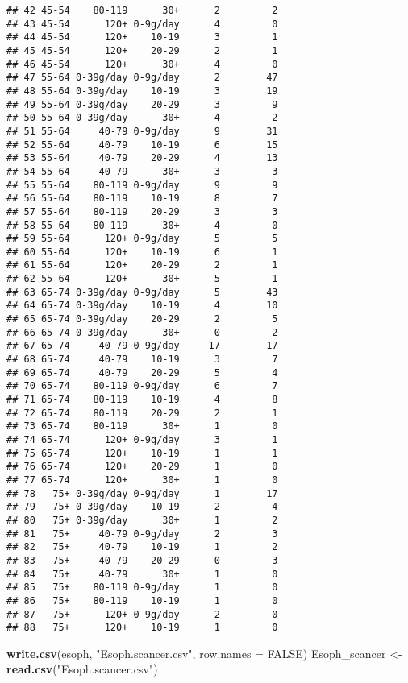 \documentclass[
]{article}
\newenvironment{Shaded}{\begin{snugshade}}{\end{snugshade}}
\newcommand{\AttributeTok}[1]{\textcolor[rgb]{0.13,0.29,0.53}{#1}}
\newcommand{\ConstantTok}[1]{\textcolor[rgb]{0.56,0.35,0.01}{#1}}
\newcommand{\FunctionTok}[1]{\textcolor[rgb]{0.13,0.29,0.53}{\textbf{#1}}}
\newcommand{\NormalTok}[1]{#1}
\newcommand{\OtherTok}[1]{\textcolor[rgb]{0.56,0.35,0.01}{#1}}
\newcommand{\StringTok}[1]{\textcolor[rgb]{0.31,0.60,0.02}{#1}}
\begin{document}
\begin{verbatim}
## 42 45-54    80-119      30+      2         2
## 43 45-54      120+ 0-9g/day      4         0
## 44 45-54      120+    10-19      3         1
## 45 45-54      120+    20-29      2         1
## 46 45-54      120+      30+      4         0
## 47 55-64 0-39g/day 0-9g/day      2        47
## 48 55-64 0-39g/day    10-19      3        19
## 49 55-64 0-39g/day    20-29      3         9
## 50 55-64 0-39g/day      30+      4         2
## 51 55-64     40-79 0-9g/day      9        31
## 52 55-64     40-79    10-19      6        15
## 53 55-64     40-79    20-29      4        13
## 54 55-64     40-79      30+      3         3
## 55 55-64    80-119 0-9g/day      9         9
## 56 55-64    80-119    10-19      8         7
## 57 55-64    80-119    20-29      3         3
## 58 55-64    80-119      30+      4         0
## 59 55-64      120+ 0-9g/day      5         5
## 60 55-64      120+    10-19      6         1
## 61 55-64      120+    20-29      2         1
## 62 55-64      120+      30+      5         1
## 63 65-74 0-39g/day 0-9g/day      5        43
## 64 65-74 0-39g/day    10-19      4        10
## 65 65-74 0-39g/day    20-29      2         5
## 66 65-74 0-39g/day      30+      0         2
## 67 65-74     40-79 0-9g/day     17        17
## 68 65-74     40-79    10-19      3         7
## 69 65-74     40-79    20-29      5         4
## 70 65-74    80-119 0-9g/day      6         7
## 71 65-74    80-119    10-19      4         8
## 72 65-74    80-119    20-29      2         1
## 73 65-74    80-119      30+      1         0
## 74 65-74      120+ 0-9g/day      3         1
## 75 65-74      120+    10-19      1         1
## 76 65-74      120+    20-29      1         0
## 77 65-74      120+      30+      1         0
## 78   75+ 0-39g/day 0-9g/day      1        17
## 79   75+ 0-39g/day    10-19      2         4
## 80   75+ 0-39g/day      30+      1         2
## 81   75+     40-79 0-9g/day      2         3
## 82   75+     40-79    10-19      1         2
## 83   75+     40-79    20-29      0         3
## 84   75+     40-79      30+      1         0
## 85   75+    80-119 0-9g/day      1         0
## 86   75+    80-119    10-19      1         0
## 87   75+      120+ 0-9g/day      2         0
## 88   75+      120+    10-19      1         0
\end{verbatim}

\begin{Shaded}
\begin{Highlighting}[]
\FunctionTok{write.csv}\NormalTok{(esoph, }\StringTok{"Esoph.scancer.csv"}\NormalTok{, }\AttributeTok{row.names =} \ConstantTok{FALSE}\NormalTok{)}
\NormalTok{Esoph\_scancer }\OtherTok{\textless{}{-}} \FunctionTok{read.csv}\NormalTok{(}\StringTok{"Esoph.scancer.csv"}\NormalTok{)}
\end{Highlighting}
\end{Shaded}
\end{document}
